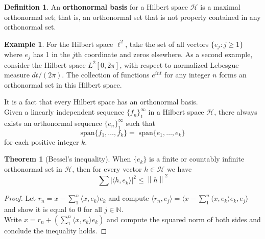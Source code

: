 \documentclass{article}
\theoremstyle{definition}
\newtheorem{theorem}{Theorem}
\newtheorem{example}{Example}
\newtheorem*{defn}{Definition}
\newcommand{\norm}[1]{\left\lVert#1\right\rVert}
\begin{document}
    \begin{defn}
        An \textbf{orthonormal basis} for a Hilbert space $\mathcal{H}$ is a maximal orthonormal set; that is, an orthonormal set that
        is not properly contained in any orthonormal set.
    \end{defn}

    \begin{example}
        For the Hilbert space $\ell^2$, take the set of all vectors $\{e_j: j\geq 1\}$ where $e_j$ has 1 in the $j$th coordinate
        and zeros elsewhere. As a second example, consider the Hilbert space $L^2[0,2\pi]$, with respect to normalized Lebesgue
        measure $dt/(2\pi)$. The collection of functions $e^{int}$ for any integer $n$ forms an orthonormal set in this Hilbert space.
    \end{example}

    It is a fact that every Hilbert space has an orthonormal basis.\\

    Given a linearly independent sequence $\{f_n\}_1^{\infty}$ in a Hilbert space $\mathcal{H}$, there always exists an orthonormal
    sequence $\{e_n\}_1^{\infty}$ such that
    \[ \text{span}\{f_1,\hdots,f_k\} =\;\text{span}\{e_1,\hdots,e_k\} \]
    for each positive integer $k$.\\

    \begin{theorem}[Bessel's inequality]
        When $\{e_k\}$ is a finite or countably infinite orthonormal set in $\mathcal{H}$, then for every vector $h\in\mathcal{H}$
        we have
        \[ \sum |\langle h,e_k\rangle|^2 \leq \norm{h}^2 \]
    \end{theorem}
    \begin{proof}
        Let $r_n = x - \sum_1^n \langle x,e_k\rangle e_k$ and compute $\langle r_n,e_j\rangle = 
        \langle x-\sum_1^n\langle x,e_k\rangle e_k,e_j\rangle$ and show it is equal to 0 for all $j\in\mathbb{N}$.\\

        Write $x = r_n + (\sum_1^n \langle x,e_k\rangle e_k)$ and compute the squared norm of both sides and conclude the inequality
        holds.
    \end{proof}
\end{document}
